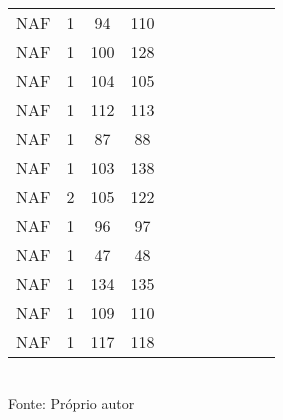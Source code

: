 \begin{table}[H]
{\begin{tabular}{ccccccccccc}
NAF & 1 & 94 & 110 &  &  &  &  &  &  &  \\
NAF & 1 & 100 & 128 &  &  &  &  &  &  &  \\
NAF & 1 & 104 & 105 &  &  &  &  &  &  &  \\
NAF & 1 & 112 & 113 &  &  &  &  &  &  &  \\
NAF & 1 & 87 & 88 &  &  &  &  &  &  &  \\
NAF & 1 & 103 & 138 &  &  &  &  &  &  &  \\
NAF & 2 & 105 & 122 &  &  &  &  &  &  &  \\
NAF & 1 & 96 & 97 &  &  &  &  &  &  &  \\
NAF & 1 & 47 & 48 &  &  &  &  &  &  &  \\
NAF & 1 & 134 & 135 &  &  &  &  &  &  &  \\
NAF & 1 & 109 & 110 &  &  &  &  &  &  &  \\
NAF & 1 & 117 & 118 &  &  &  &  &  &  &  \\
\bottomrule
\end{tabular}}
\\Fonte: Próprio autor
\end{table}


